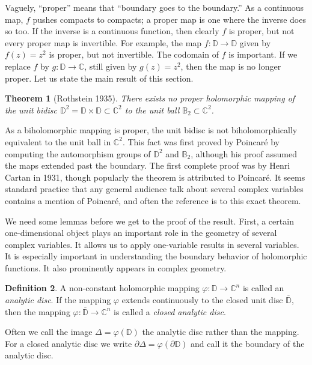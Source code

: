 \documentclass[12pt,openany]{book}
\newcommand{\C}{{\mathbb{C}}}
\newcommand{\D}{{\mathbb{D}}}
\newcommand{\bB}{{\mathbb{B}}}
\newcommand{\bD}{{\mathbb{D}}}
\newcommand{\myindex}[1]{#1\index{#1}}
\theoremstyle{plain}
\newtheorem{thm}{Theorem}[section]
\theoremstyle{remark}
\theoremstyle{definition}
\newtheorem{defn}[thm]{Definition}
\theoremstyle{exercise}
\theoremstyle{example}
\begin{document}
Vaguely, ``proper'' means that ``boundary goes to the boundary.''
As a continuous map, $f$ pushes compacts to compacts; a proper map is
one where the inverse does so too.  If the inverse is a continuous
function, then clearly $f$ is proper,
but not every proper map is invertible.  For
example, the map $f \colon \D \to \D$ given by $f(z) = z^2$ is proper, but
not invertible.  The codomain of $f$ is important.  If we 
replace $f$ by $g \colon \D \to \C$, still given by $g(z)=z^2$,
then the map is
no longer proper.  Let us state the main result of this section.

\begin{thm}[Rothstein 1935] \label{thm:Rothstein}
There exists no proper holomorphic mapping of the unit bidisc $\D^2 = \bD \times \bD
\subset \C^2$ to the unit ball $\bB_2 \subset \C^2$.
\end{thm}

As a biholomorphic mapping is proper,
the unit bidisc is not biholomorphically
equivalent to the unit ball in $\C^2$.  This fact was first proved by
Poincar\'e by computing the automorphism groups of $\D^2$ and $\bB_2$,
although his proof
assumed the maps extended past the boundary.  The first
complete proof was by Henri Cartan in 1931, though popularly the theorem is
attributed to Poincar\'e.  It seems standard practice that any general audience talk
about several complex variables contains a mention of Poincar\'e,
and often the reference is to this exact theorem.

We need some lemmas before we get to the proof of the result.  First,
a certain one-dimensional object plays an important role in the geometry
of several complex variables.  It allows us to apply one-variable
results in several variables.  It is especially important in
understanding the boundary behavior of holomorphic functions.  It also
prominently appears in complex geometry.

\begin{defn}
A non-constant holomorphic mapping
$\varphi \colon \D \to \C^n$ is called an \emph{\myindex{analytic disc}}.
If the mapping $\varphi$ extends continuously to the closed unit disc
$\overline{\D}$, then the mapping
$\varphi \colon \overline{\D} \to \C^n$ is called
a \emph{\myindex{closed analytic disc}}.

Often we call the image $\Delta = \varphi(\D)$ the analytic disc
rather than the mapping.  For a closed analytic disc we write
$\partial \Delta = \varphi( \partial \D)$ and call it the boundary
of the analytic disc.
\end{defn}
\end{document}
